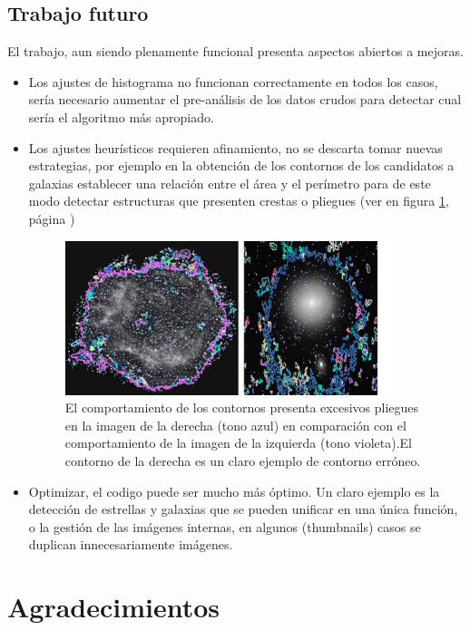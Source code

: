	\subsection{Trabajo futuro}
	El trabajo, aun siendo plenamente funcional presenta aspectos abiertos a mejoras.
	\begin{itemize} 
	\item Los ajustes de histograma no funcionan correctamente en todos los casos, sería necesario aumentar el pre-análisis de los datos crudos para detectar cual sería el algoritmo más apropiado.
	\item Los ajustes heurísticos requieren afinamiento, no se descarta tomar nuevas estrategias, por ejemplo en la obtención de los contornos de los candidatos a galaxias establecer una relación entre el área y el perímetro para de este modo detectar estructuras que presenten crestas o pliegues (ver en figura \ref{fig:MembraneNebulae}, página \pageref{fig:MembraneNebulae})
		\begin{figure}[!htb]
			\centering
			\includegraphics[width=0.9\textwidth]{images/nebulaMembrana2.jpg}
			\caption{\label{fig:MembraneNebulae}El comportamiento de los contornos presenta excesivos pliegues en la imagen de la derecha (tono azul) en comparación con el comportamiento de la imagen de la izquierda (tono violeta).El contorno de la derecha es un claro ejemplo de contorno erróneo.}
		\end{figure}
	\item Optimizar, el codigo puede ser mucho más óptimo. Un claro ejemplo es la detección de estrellas y galaxias que se pueden unificar en una única función, o la gestión de las imágenes internas, en algunos (thumbnails) casos se duplican innecesariamente imágenes.
	\end{itemize} 
	
	\newpage
	\section{Agradecimientos}
	
